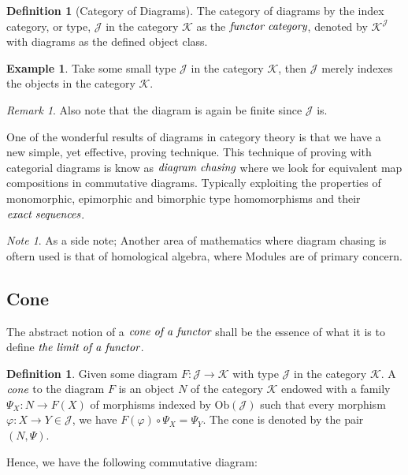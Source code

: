 \documentclass[10pt, oneside, reqno]{amsart}
\theoremstyle{plain}%
\theoremstyle{definition}
\newtheorem{defn}[thm]{Definition}
\newtheorem{exmp}[thm]{Example}
\theoremstyle{remark}
\newtheorem*{rem}{Remark}
\newtheorem*{note}{Note}
\begin{document}
\begin{defn}[Category of Diagrams]
 The category of diagrams by the index category, or type, $\mathcal{J}$ in the category $\mathcal{K}$ as the $\emph{functor category}$,
 denoted by $\mathcal{K}^{\mathcal{J}}$ with diagrams as the defined object class.
\end{defn}

\begin{exmp}
 Take some small type $\mathcal{J}$ in the category $\mathcal{K}$,
 then $\mathcal{J}$ merely indexes the objects in the category $\mathcal{K}$.
 \begin{rem}
  Also note that the diagram is again be finite since $\mathcal{J}$ is.
 \end{rem}
\end{exmp}

One of the wonderful results of diagrams in category theory is that we have a new simple, yet effective, proving technique.
This technique of proving with categorial diagrams is know as $\emph{diagram chasing}$ where we look for equivalent map compositions in commutative diagrams.
Typically exploiting the properties of monomorphic, epimorphic and bimorphic type homomorphisms and their $\emph{exact sequences}$.
\begin{note}
 As a side note;
 Another area of mathematics where diagram chasing is oftern used is that of homological algebra, where Modules are of primary concern.
\end{note}

\subsection{Cone} %
\label{subsec:cone}
The abstract notion of a $\emph{cone of a functor}$ shall be the essence of what it is to define $\emph{the limit of a functor}$.

\begin{defn}
 Given some diagram $F: \mathcal{J} \to \mathcal{K}$ with type $\mathcal{J}$ in the category $\mathcal{K}$.
 A $\emph{cone}$ to the diagram $F$ is an object $N$ of the category $\mathcal{K}$ endowed with a family $\Psi_{X}: N \to F(X)$ of morphisms
 indexed by $\text{Ob}(\mathcal{J})$ such that every morphism $\varphi: X \to Y \in \mathcal{J}$, we have $F(\varphi) \circ \Psi_{X} = \Psi_{Y}$.
 The cone is denoted by the pair $(N, \Psi)$.
\end{defn}

Hence, we have the following commutative diagram:
\end{document}
